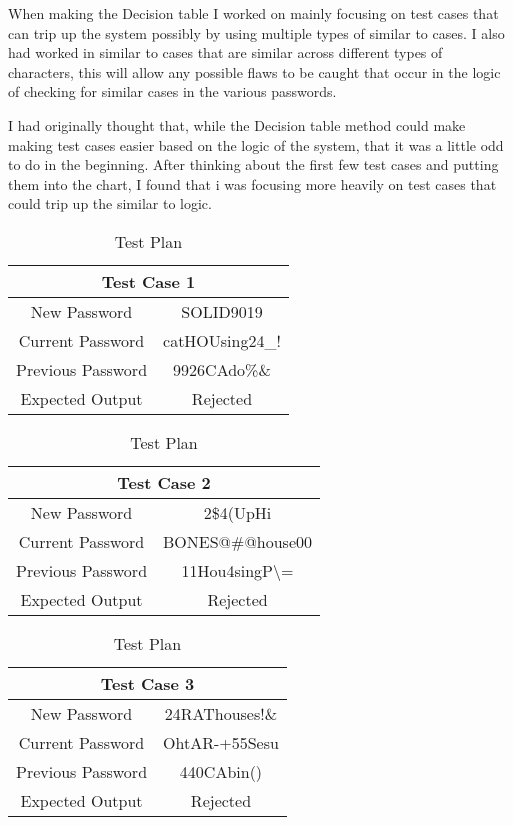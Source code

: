 \documentclass[12pt,letterpaper]{article}
\begin{document}
When making the Decision table I worked on mainly focusing on test cases that can trip up the
system possibly by using multiple types of similar to cases.  I also had worked in similar to cases
that are similar across different types of characters, this will allow any possible
flaws to be caught that occur in the logic of checking for similar cases in the
various passwords.

I had originally thought that, while the Decision table method could make making test cases easier based on the logic
of the system, that it was a little odd to do in the beginning.
After thinking about the first few test cases and putting them into the chart, I found that i was focusing more heavily on test cases
that could trip up the similar to logic.

\begin{table}[h]
  \caption{Test Plan}
  \label{tab:Test Plan}
\begin{centering}
  \begin{tabular}{||c|c||}
  \hline
  \multicolumn{2}{||c||}{Test Case 1} \\
  \hline
  New Password & SOLID9019 \\
  \hline
  Current Password & catHOUsing24\_! \\
  \hline
  Previous Password & 9926CAdo\%\& \\
  \hline
  Expected Output & Rejected \\
  \hline
  \end{tabular}
  \begin{tabular}{||c|c||}
  \hline
  \multicolumn{2}{||c||}{Test Case 2} \\
  \hline
  New Password & 2\$4(UpHi \\
  \hline
  Current Password & BONES@\#@house00 \\
  \hline
  Previous Password & 11Hou4singP\textbackslash= \\
  \hline
  Expected Output & Rejected \\
  \hline
  \end{tabular}
  \begin{tabular}{||c|c||}
  \hline
  \multicolumn{2}{||c||}{Test Case 3} \\
  \hline
  New Password & 24RAThouses!\& \\
  \hline
  Current Password & OhtAR-+55Sesu \\
  \hline
  Previous Password & 440CAbin() \\
  \hline
  Expected Output & Rejected \\

\end{tabular}
\end{centering}
\end{table}
\end{document}
